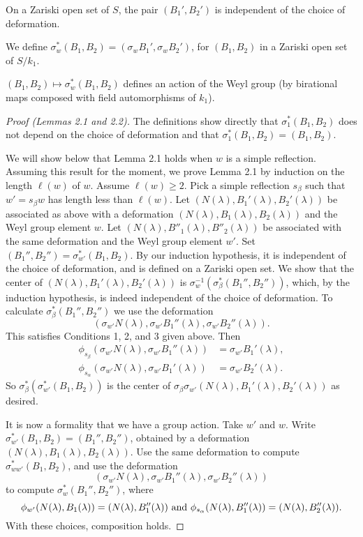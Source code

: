 \documentclass{amsart}
\begin{document}
  On a Zariski open set of $S$, the pair $(B_1',B_2')$ is
independent of the choice of deformation.
\endproclaim

  We define $\sigma^*_w (B_1,B_2) = (\sigma_w B_1',\sigma_w B_2')$,
for $(B_1,B_2)$ in a Zariski open set of $S/k_1$.
\endproclaim

  $(B_1,B_2) \mapsto \sigma^*_w (B_1,B_2)$ defines an action
of the Weyl group (by birational maps composed with field automorphisms of $k_1$).
\endproclaim

\begin{proof}[Proof (Lemmas 2.1 and 2.2)] 
The definitions show directly that
$\sigma^*_1 (B_1,B_2)$ does not depend on the choice of deformation and
that $\sigma^*_1 (B_1,B_2) = (B_1,B_2)$.

We will show below that Lemma 2.1 holds when $w$ is a simple reflection.
Assuming this result for the moment, we prove Lemma 2.1 by induction on
the length $\ell(w)$ of $w$.  Assume $\ell(w)\ge 2$.  Pick a simple
reflection $s_\beta$ such that $w' = s_\beta w$ has length less than $\ell(w)$.
Let $(N(\lambda),B_1'(\lambda),B_2'(\lambda))$ be 
associated as above 
with a deformation $(N(\lambda),B_1(\lambda),B_2(\lambda))$
and the Weyl group element $w$.  Let $(N(\lambda),B''_1(\lambda),B''_2(\lambda))$
be associated with the same deformation and the Weyl group element $w'$.
Set $(B_1'',B_2'') = \sigma^*_{w'}(B_1,B_2)$.  By our induction hypothesis,
it is independent of the choice of deformation, and is defined on a Zariski
open set.  We show that the center of $(N(\lambda),B_1'(\lambda),B_2'(\lambda))$
is $\sigma_w^{-1}(\sigma^*_\beta(B_1'',B_2''))$, which, by the
induction hypothesis, is indeed
independent of the choice of deformation.   To calculate
$\sigma^*_\beta(B_1'',B_2'')$ we use the deformation
$$(\sigma_{w'}N(\lambda),\sigma_{w'}B_1''(\lambda),\sigma_{w'}B_2''(\lambda)).$$
This satisfies Conditions 1, 2, and 3 given above.
Then
\begin{align*}
\phi_{s_\beta}(\sigma_{w'}N(\lambda),\sigma_{w'}B_1''(\lambda))&=
      \sigma_{w'}B_1'(\lambda),\\
\phi_{s_\alpha}(\sigma_{w'}N(\lambda),\sigma_{w'}B_1'(\lambda))&=
      \sigma_{w'}B_2'(\lambda).
\end{align*}
So $\sigma_\beta^* (\sigma^*_{w'} (B_1,B_2))$ is the center of 
$\sigma_\beta\sigma_{w'}(N(\lambda),B_1'(\lambda),B_2'(\lambda))$ as desired.

It is now a formality that we have a group action.  Take $w'$ and $w$.
Write $\sigma^*_{w'} (B_1,B_2) = (B_1'',B_2'')$, obtained by a deformation
$(N(\lambda),B_1(\lambda),B_2(\lambda))$.  Use the same deformation to
compute $\sigma^*_{ww'} (B_1,B_2)$, and use the deformation 
$$(\sigma_{w'}N(\lambda),\sigma_{w'}B_1''(\lambda),\sigma_{w'}B_2''(\lambda))$$
to compute $\sigma^*_w (B_1'',B_2'')$, where
$$\phi_{w'}(N(\lambda),B_1(\lambda)) = (N(\lambda),B_1''(\lambda))
\hbox{ and } \phi_{s_\alpha}(N(\lambda),B''_1(\lambda)) = (N(\lambda),B_2''(\lambda)).$$
With these choices, composition holds.


\end{proof}
\end{document}
